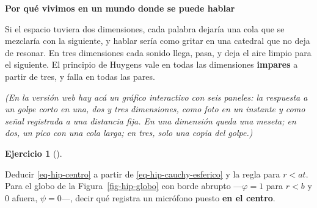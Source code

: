 \documentclass[
  spanish,
  a4paper,
]{scrbook}
\theoremstyle{definition}
\theoremstyle{plain}
\theoremstyle{definition}
\theoremstyle{plain}
\theoremstyle{definition}
\newtheorem{exercise}{Ejercicio}[chapter]
\theoremstyle{remark}
\begin{document}
\begin{tcolorbox}[enhanced jigsaw, arc=.35mm, bottomrule=.15mm, breakable, colback=white, colframe=quarto-callout-important-color-frame, left=2mm, leftrule=.75mm, opacityback=0, rightrule=.15mm, toprule=.15mm]
\begin{minipage}[t]{5.5mm}
\textcolor{quarto-callout-important-color}{\faExclamation}
\end{minipage}%
\begin{minipage}[t]{\textwidth - 5.5mm}

\vspace{-3mm}\textbf{Por qué vivimos en un mundo donde se puede hablar}\vspace{3mm}

Si el espacio tuviera dos dimensiones, cada palabra dejaría una cola que
se mezclaría con la siguiente, y hablar sería como gritar en una
catedral que no deja de resonar. En tres dimensiones cada sonido llega,
pasa, y deja el aire limpio para el siguiente. El principio de Huygens
vale en todas las dimensiones \textbf{impares} a partir de tres, y falla
en todas las pares.

\end{minipage}%
\end{tcolorbox}

\emph{(En la versión web hay acá un gráfico interactivo con seis
paneles: la respuesta a un golpe corto en una, dos y tres dimensiones,
como foto en un instante y como señal registrada a una distancia fija.
En una dimensión queda una meseta; en dos, un pico con una cola larga;
en tres, solo una copia del golpe.)}

\begin{exercise}[]\protect\hypertarget{exr-hip-globo}{}\label{exr-hip-globo}

Deducir \ref{eq-hip-centro} a partir de \ref{eq-hip-cauchy-esferico} y
la regla para \(r<at\). Para el globo de la Figura~\ref{fig-hip-globo}
con borde abrupto ---\(\varphi = 1\) para \(r<b\) y \(0\) afuera,
\(\psi = 0\)---, decir qué registra un micrófono puesto \textbf{en el
centro}.

\end{exercise}
\end{document}

